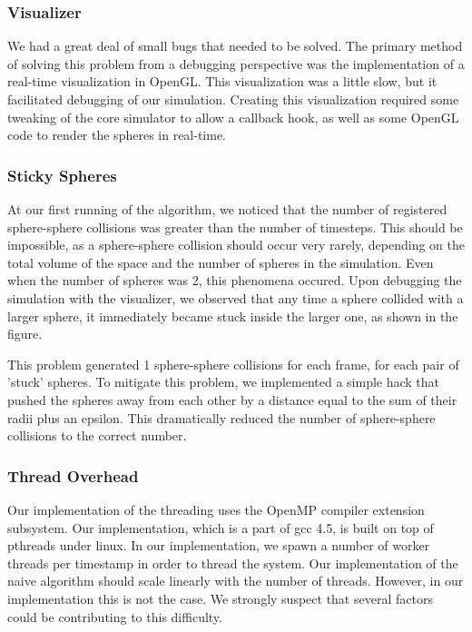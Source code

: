 \documentclass[conference]{IEEEtran}
\begin{document}
\subsubsection{Visualizer}
We had a great deal of small bugs that needed to be solved.  The primary method of solving this problem from a debugging perspective was the implementation of a real-time visualization in OpenGL.
This visualization was a little slow, but it facilitated debugging of our simulation.  Creating this visualization required some tweaking of the core simulator to allow a callback hook, as well as some OpenGL code to render the spheres in real-time.

\subsubsection{Sticky Spheres}
At our first running of the algorithm, we noticed that the number of registered sphere-sphere collisions was greater than the number of timesteps.  This should be impossible, as a sphere-sphere collision should
occur very rarely, depending on the total volume of the space and the number of spheres in the simulation.  Even when the number of spheres was 2, this phenomena occured.  Upon debugging the simulation with the visualizer,
we observed that any time a sphere collided with a larger sphere, it immediately became stuck inside the larger one, as shown in the figure.  


This problem generated 1 sphere-sphere collisions for each frame, for each pair of 'stuck' spheres.  To mitigate this problem, we implemented a simple hack that pushed the spheres away from each other by a distance equal to the sum of their radii plus an epsilon.
This dramatically reduced the number of sphere-sphere collisions to the correct number.

\subsubsection{Thread Overhead}
	Our implementation of the threading uses the OpenMP compiler extension subsystem.  Our implementation, which is a part of gcc 4.5, is built on top of pthreads under linux.  In our implementation, we 
spawn a number of worker threads per timestamp in order to thread the system.  Our implementation of the naive algorithm should scale linearly with the number of threads.  However, in our implementation this is not the case.  We strongly suspect that
several factors could be contributing to this difficulty.  
\end{document}
